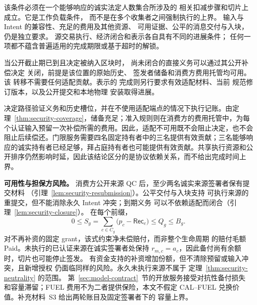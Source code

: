 该条件必须在一个能够响应的诚实法定人数集合所涉及的
相关扣减步骤和切片上成立。它是工作负载条件，
而不是在多个收集者之间强制执行的上界。
输入与 Intent 的兼容性、充足的费用及其他资源、
可用证据、公平的消息交付与入块，仍是独立要求。
源交易执行、经济闭合和表示各自具有不同的进展条件；
任何一项都不蕴含普遍适用的完成期限或基于超时的解锁。

\begin{lemma}[经济闭合不等待适配]
\label{lem:security-closure}
当公开截止期已到且决定被纳入区块时，
尚未闭合的直接义务可以通过其公开补偿决定
关闭，前提是该位置的原始历史、
签发者储备和消费方费用托管均可用。该
转移不需要任何适配贡献。表示的
完成则另行要求有效适配材料、当前
规范修订版本，以及公开提交和本地物理
安装取得进展。
\end{lemma}
\begin{IEEEproof}
决定路径验证义务和历史槽位，并在不使用适配端点的情况下执行记账。由定理~\ref{thm:security-coverage}，储备充足；准入规则则在消费方的费用托管中，为每个认证输入预留一次补偿所需的费用。因此，适配不可用既不会阻止决定，也不会阻止后续偿还。门限服务需要四名固定持有者中的三名提供有效贡献；三名能够响应的诚实持有者已经足够，拜占庭持有者也可能提供有效贡献。共享执行资源和公开排序仍然影响时延，因此该结论区分的是协议依赖关系，而不给出完成时间上界。
\end{IEEEproof}

\noindent\textbf{可用性与担保方风险。}
消费方公开来源 QC 后，至少两名诚实来源签署者保有提交材料
（引理~\ref{lem:security-resubmission}）。公平交付与入块支持
可执行来源的重提交，但不能消除永久 Intent 冲突；到期义务
可以不依赖适配而闭合（引理~\ref{lem:security-closure}）。
在每个前缀，
\[
  0\le S_g=\sum_{c\in C_g}
       \bigl(p_c-\mathsf{Rec}_c\bigr)\le Q_g\le B_g .
\]
对不再补资的固定 grant，该式约束净未偿赔付，而非整个生命周期
的赔付毛额 Paid。未执行的已认证来源在诚实签署者处保持
$r_{m,c}=a_c$，因此备付尚有余额时，切片也可能停止签发。
有资金支持的补资增加份额，但不清除预留或输入冲突，且新增授权
仍面临同样的风险。永久未执行来源不属于
定理~\ref{thm:security-neutrality} 的范围。
第~\ref{sec:model-contract}~节的开放服务接受对抗性备付损失
和容量滞留；FUEL 费用不为二者提供保险，本文不假定
CAL--FUEL 兑换价值。补充材料~S3 给出两轮账目及固定签署者下的
容量上界。
